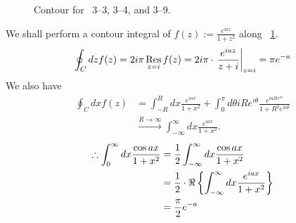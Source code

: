 \item

\begin{figure}[h]
	\centering
	\caption{Contour for ~3--3, 3--4, and 3--9.}%
	\label{fig:problem3-3}
\end{figure}

We shall perform a contour integral of $f(z) := \frac{e^{iaz}}{1 + z^2}$ along ~\ref{fig:problem3-3}.
\[
	\oint_C dz f(z)
	= 2i\pi \mathop{\mathrm{Res}}_{z = i} f(z)
	= 2i\pi \cdot {\left. \frac{e^{iaz}}{z + i} \right|}_{z = i}
	= \pi e^{-a}
\]
We also have
\begin{align*}
	\oint_C dx f(z)
	 & = \int_{-R}^{R} dx \frac{e^{iax}}{1 + x^2}
	+\int_0^{\pi} d\theta iRe^{i\theta} \frac{e^{iaRe^{i\theta}}}{1 + R^2 e^{2i\theta}}       \\
	 & \xrightarrow{R \rightarrow \infty} \int_{-\infty}^{\infty} dx \frac{e^{iax}}{1 + x^2}.
\end{align*}
\begin{align*}
	\therefore \int_{0}^{\infty} dx \frac{\cos ax}{1 + x^2}
	 & = \frac{1}{2} \int_{-\infty}^{\infty} dx \frac{\cos ax}{1 + x^2}                            \\
	 & = \frac{1}{2} \cdot \Re \left\{ \int_{-\infty}^{\infty} dx \frac{e^{iax}}{1 + x^2} \right\} \\
	 & = \frac{\pi}{2} e^{-a}
\end{align*}